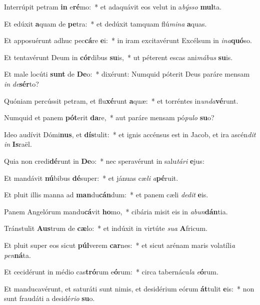 \item Interrúpit petram \textbf{in} e\textbf{ré}mo:~* et adaquávit eos velut in a\textit{býs}\textit{so} \textbf{mul}ta.
\item Et edúxit \textbf{a}quam de \textbf{pe}tra:~* et dedúxit tamquam flú\textit{mi}\textit{na} \textbf{a}quas.
\item Et apposuérunt adhuc pec\textbf{cá}re \textbf{e}i:~* in iram excitavérunt Excélsum in \textit{in}\textit{a}\textbf{quó}so.
\item Et tentavérunt Deum in \textbf{cór}dibus \textbf{su}is,~* ut péterent escas ani\textit{má}\textit{bus} \textbf{su}is.
\item Et male locúti \textbf{sunt} de \textbf{De}o:~* dixérunt: Numquid póterit Deus paráre mensam \textit{in} \textit{de}\textbf{sér}to?
\item Quóniam percússit petram, et flu\textbf{xé}runt \textbf{a}quæ:~* et torréntes in\textit{un}\textit{da}\textbf{vé}runt.
\item Numquid et panem \textbf{pót}erit \textbf{da}re,~* aut paráre mensam pó\textit{pu}\textit{lo} \textbf{su}o?
\item Ideo audívit Dómi\textbf{nus}, et \textbf{dís}tulit:~* et ignis accénsus est in Jacob, et ira ascén\textit{dit} \textit{in} \textbf{Is}raël.
\item Quia non credi\textbf{dé}runt in \textbf{De}o:~* nec speravérunt in salu\textit{tá}\textit{ri} \textbf{e}jus:
\item Et mandávit \textbf{nú}bibus \textbf{dé}super:~* et jánuas cæ\textit{li} \textit{a}\textbf{pé}ruit.
\item Et pluit illis manna ad \textbf{man}du\textbf{cán}dum:~* et panem cæli \textit{de}\textit{dit} \textbf{e}is.
\item Panem Angelórum mandu\textbf{cá}vit \textbf{ho}mo,~* cibária misit eis in \textit{ab}\textit{un}\textbf{dán}tia.
\item Tránstulit \textbf{Aus}trum de \textbf{cæ}lo:~* et indúxit in virtúte \textit{su}\textit{a} \textbf{A}fricum.
\item Et pluit super eos sicut \textbf{púl}verem \textbf{car}nes:~* et sicut arénam maris volatíli\textit{a} \textit{pen}\textbf{ná}ta.
\item Et cecidérunt in médio cas\textbf{tró}rum e\textbf{ó}rum:~* circa tabernácu\textit{la} \textit{e}\textbf{ó}rum.
\item Et manducavérunt, et saturáti sunt nimis, et desidérium eórum \textbf{át}tulit \textbf{e}is:~* non sunt fraudáti a desidé\textit{ri}\textit{o} \textbf{su}o.
